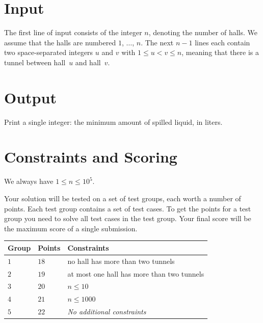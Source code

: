 \section*{Input}

The first line of input consists of the integer $n$, denoting the number of halls.
We assume that the halls are numbered $1$, $\ldots$, $n$.
The next $n-1$ lines each contain two space-separated integers $u$ and $v$ with 
$1\leq u < v \leq n$, %
meaning that there is a tunnel between hall~$u$ and hall~$v$.

\section*{Output}

Print a single integer: the minimum amount of spilled liquid, in liters.

\section*{Constraints and Scoring}

We always have
$1\leq n\leq 10^5$. %

Your solution will be tested on a set of test groups, each worth a number of points.
Each test group contains a set of test cases.
To get the points for a test group you need to solve all test cases in the test group.
Your final score will be the maximum score of a single submission.

\medskip
\begin{tabular}{lll}
Group & Points & Constraints \\\hline
  $1$ & $18$ & no hall has more than two tunnels\\
  $2$ & $19$ & at most one hall has more than two tunnels\\
  $3$ & $20$ & $n\leq 10$\\
  $4$ & $21$ & $n\leq 1000$\\
  $5$ & $22$ & \emph{No additional constraints}
\end{tabular}
